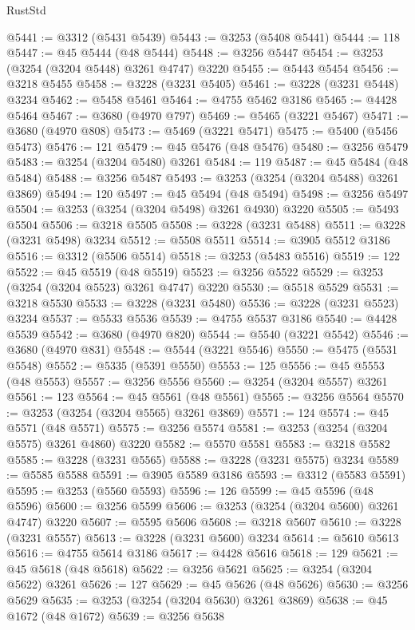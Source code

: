 \begin{lexlean}{RustStd}
\begin{coremodule}
{\begin{coremodule}
{{{{{{{{{{{{{{{{{{{{{{{{{{{{{{{{{{{{{@5441 := @3312 (@5431 @5439)
@5443 := @3253 (@5408 @5441)
@5444 := 118
@5447 := @45 @5444 (@48 @5444)
@5448 := @3256 @5447
@5454 := @3253 (@3254 (@3204 @5448) @3261 @4747) @3220
@5455 := @5443 @5454
@5456 := @3218 @5455
@5458 := @3228 (@3231 @5405)
@5461 := @3228 (@3231 @5448) @3234
@5462 := @5458 @5461
@5464 := @4755 @5462 @3186
@5465 := @4428 @5464
@5467 := @3680 (@4970 @797)
@5469 := @5465 (@3221 @5467)
@5471 := @3680 (@4970 @808)
@5473 := @5469 (@3221 @5471)
@5475 := @5400 (@5456 @5473)
@5476 := 121
@5479 := @45 @5476 (@48 @5476)
@5480 := @3256 @5479
@5483 := @3254 (@3204 @5480) @3261
@5484 := 119
@5487 := @45 @5484 (@48 @5484)
@5488 := @3256 @5487
@5493 := @3253 (@3254 (@3204 @5488) @3261 @3869)
@5494 := 120
@5497 := @45 @5494 (@48 @5494)
@5498 := @3256 @5497
@5504 := @3253 (@3254 (@3204 @5498) @3261 @4930) @3220
@5505 := @5493 @5504
@5506 := @3218 @5505
@5508 := @3228 (@3231 @5488)
@5511 := @3228 (@3231 @5498) @3234
@5512 := @5508 @5511
@5514 := @3905 @5512 @3186
@5516 := @3312 (@5506 @5514)
@5518 := @3253 (@5483 @5516)
@5519 := 122
@5522 := @45 @5519 (@48 @5519)
@5523 := @3256 @5522
@5529 := @3253 (@3254 (@3204 @5523) @3261 @4747) @3220
@5530 := @5518 @5529
@5531 := @3218 @5530
@5533 := @3228 (@3231 @5480)
@5536 := @3228 (@3231 @5523) @3234
@5537 := @5533 @5536
@5539 := @4755 @5537 @3186
@5540 := @4428 @5539
@5542 := @3680 (@4970 @820)
@5544 := @5540 (@3221 @5542)
@5546 := @3680 (@4970 @831)
@5548 := @5544 (@3221 @5546)
@5550 := @5475 (@5531 @5548)
@5552 := @5335 (@5391 @5550)
@5553 := 125
@5556 := @45 @5553 (@48 @5553)
@5557 := @3256 @5556
@5560 := @3254 (@3204 @5557) @3261
@5561 := 123
@5564 := @45 @5561 (@48 @5561)
@5565 := @3256 @5564
@5570 := @3253 (@3254 (@3204 @5565) @3261 @3869)
@5571 := 124
@5574 := @45 @5571 (@48 @5571)
@5575 := @3256 @5574
@5581 := @3253 (@3254 (@3204 @5575) @3261 @4860) @3220
@5582 := @5570 @5581
@5583 := @3218 @5582
@5585 := @3228 (@3231 @5565)
@5588 := @3228 (@3231 @5575) @3234
@5589 := @5585 @5588
@5591 := @3905 @5589 @3186
@5593 := @3312 (@5583 @5591)
@5595 := @3253 (@5560 @5593)
@5596 := 126
@5599 := @45 @5596 (@48 @5596)
@5600 := @3256 @5599
@5606 := @3253 (@3254 (@3204 @5600) @3261 @4747) @3220
@5607 := @5595 @5606
@5608 := @3218 @5607
@5610 := @3228 (@3231 @5557)
@5613 := @3228 (@3231 @5600) @3234
@5614 := @5610 @5613
@5616 := @4755 @5614 @3186
@5617 := @4428 @5616
@5618 := 129
@5621 := @45 @5618 (@48 @5618)
@5622 := @3256 @5621
@5625 := @3254 (@3204 @5622) @3261
@5626 := 127
@5629 := @45 @5626 (@48 @5626)
@5630 := @3256 @5629
@5635 := @3253 (@3254 (@3204 @5630) @3261 @3869)
@5638 := @45 @1672 (@48 @1672)
@5639 := @3256 @5638
}}}}}}}}}}}}}}}}}}}}}}}}}}}}}}}}}}}}}
\end{coremodule}}
\end{coremodule}
\end{lexlean}
